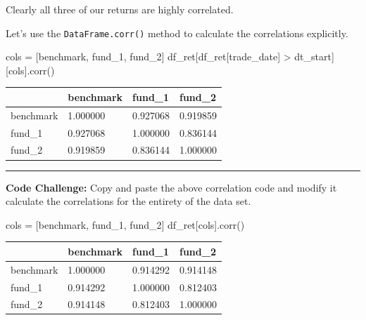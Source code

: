 \documentclass[
  letterpaper,
  DIV=11,
  numbers=noendperiod]{scrreprt}
\newenvironment{Shaded}{\begin{snugshade}}{\end{snugshade}}
\newcommand{\NormalTok}[1]{\textcolor[rgb]{0.00,0.23,0.31}{#1}}
\newcommand{\OperatorTok}[1]{\textcolor[rgb]{0.37,0.37,0.37}{#1}}
\newcommand{\StringTok}[1]{\textcolor[rgb]{0.13,0.47,0.30}{#1}}
\begin{document}
Clearly all three of our returns are highly correlated.

Let's use the \texttt{DataFrame.corr()} method to calculate the
correlations explicitly.

\begin{Shaded}
\begin{Highlighting}[]
\NormalTok{cols }\OperatorTok{=}\NormalTok{ [}\StringTok{\textquotesingle{}benchmark\textquotesingle{}}\NormalTok{, }\StringTok{\textquotesingle{}fund\_1\textquotesingle{}}\NormalTok{, }\StringTok{\textquotesingle{}fund\_2\textquotesingle{}}\NormalTok{]}
\NormalTok{df\_ret[df\_ret[}\StringTok{\textquotesingle{}trade\_date\textquotesingle{}}\NormalTok{] }\OperatorTok{\textgreater{}}\NormalTok{ dt\_start][cols].corr()}
\end{Highlighting}
\end{Shaded}

\begin{longtable}[]{@{}llll@{}}
\toprule\noalign{}
& benchmark & fund\_1 & fund\_2 \\
\midrule\noalign{}
\endhead
\bottomrule\noalign{}
\endlastfoot
benchmark & 1.000000 & 0.927068 & 0.919859 \\
fund\_1 & 0.927068 & 1.000000 & 0.836144 \\
fund\_2 & 0.919859 & 0.836144 & 1.000000 \\
\end{longtable}

\begin{center}\rule{0.5\linewidth}{0.5pt}\end{center}

\textbf{Code Challenge:} Copy and paste the above correlation code and
modify it calculate the correlations for the entirety of the data set.

\begin{Shaded}
\begin{Highlighting}[]
\NormalTok{cols }\OperatorTok{=}\NormalTok{ [}\StringTok{\textquotesingle{}benchmark\textquotesingle{}}\NormalTok{, }\StringTok{\textquotesingle{}fund\_1\textquotesingle{}}\NormalTok{, }\StringTok{\textquotesingle{}fund\_2\textquotesingle{}}\NormalTok{]}
\NormalTok{df\_ret[cols].corr()}
\end{Highlighting}
\end{Shaded}

\begin{longtable}[]{@{}llll@{}}
\toprule\noalign{}
& benchmark & fund\_1 & fund\_2 \\
\midrule\noalign{}
\endhead
\bottomrule\noalign{}
\endlastfoot
benchmark & 1.000000 & 0.914292 & 0.914148 \\
fund\_1 & 0.914292 & 1.000000 & 0.812403 \\
fund\_2 & 0.914148 & 0.812403 & 1.000000 \\
\end{longtable}
\end{document}
